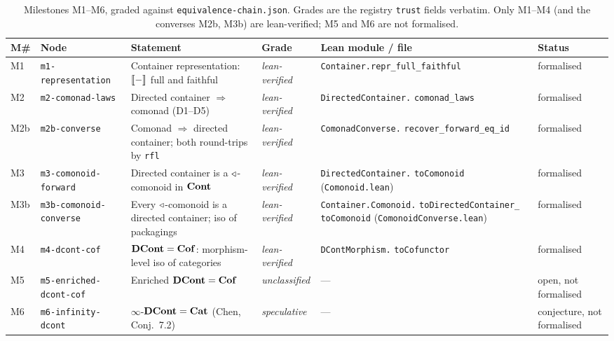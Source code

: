 \begin{table}[htbp]
\centering
\small
\caption{Milestones M1--M6, graded against \texttt{equivalence-chain.json}. Grades
are the registry \texttt{trust} fields verbatim. Only M1--M4 (and the converses
M2b, M3b) are lean-verified; M5 and M6 are not formalised.}
\label{tab:milestones}
\begin{tabular}{@{}llp{4.1cm}lp{2.9cm}l@{}}
\toprule
\textbf{M\#} & \textbf{Node} & \textbf{Statement} & \textbf{Grade} & \textbf{Lean module / file} & \textbf{Status}\\
\midrule
M1  & \texttt{m1-representation}      & Container representation: $\llbracket - \rrbracket$ full and faithful & \emph{lean-verified} & \texttt{Container.repr\_full\_faithful} & formalised\\
M2  & \texttt{m2-comonad-laws}        & Directed container $\Rightarrow$ comonad (D1--D5) & \emph{lean-verified} & \texttt{DirectedContainer.} \texttt{comonad\_laws} & formalised\\
M2b & \texttt{m2b-converse}           & Comonad $\Rightarrow$ directed container; both round-trips by \texttt{rfl} & \emph{lean-verified} & \texttt{ComonadConverse.} \texttt{recover\_forward\_eq\_id} & formalised\\
M3  & \texttt{m3-comonoid-forward}    & Directed container is a $\triangleleft$-comonoid in $\mathbf{Cont}$ & \emph{lean-verified} & \texttt{DirectedContainer.} \texttt{toComonoid} (\texttt{Comonoid.lean}) & formalised\\
M3b & \texttt{m3b-comonoid-converse}  & Every $\triangleleft$-comonoid is a directed container; iso of packagings & \emph{lean-verified} & \texttt{Container.Comonoid.} \texttt{toDirectedContainer\_} \texttt{toComonoid} (\texttt{ComonoidConverse.lean}) & formalised\\
M4  & \texttt{m4-dcont-cof}           & $\mathbf{DCont}=\mathbf{Cof}$: morphism-level iso of categories & \emph{lean-verified} & \texttt{DContMorphism.} \texttt{toCofunctor} & formalised\\
M5  & \texttt{m5-enriched-dcont-cof}  & Enriched $\mathbf{DCont}=\mathbf{Cof}$ & \emph{unclassified} & --- & open, not formalised\\
M6  & \texttt{m6-infinity-dcont}      & $\infty$-$\mathbf{DCont}=\mathbf{Cat}$ (Chen, Conj.\ 7.2) & \emph{speculative} & --- & conjecture, not formalised\\
\bottomrule
\end{tabular}
\end{table}



